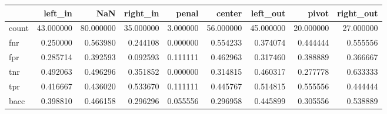 \begin{tabular}{lrrrrrrrr}
\toprule
{} &    left\_in &        NaN &   right\_in &     penal &     center &   left\_out &      pivot &  right\_out \\
\midrule
count &  43.000000 &  80.000000 &  35.000000 &  3.000000 &  56.000000 &  45.000000 &  20.000000 &  27.000000 \\
fnr   &   0.250000 &   0.563980 &   0.244108 &  0.000000 &   0.554233 &   0.374074 &   0.444444 &   0.555556 \\
fpr   &   0.285714 &   0.392593 &   0.092593 &  0.111111 &   0.462963 &   0.317460 &   0.388889 &   0.366667 \\
tnr   &   0.492063 &   0.496296 &   0.351852 &  0.000000 &   0.314815 &   0.460317 &   0.277778 &   0.633333 \\
tpr   &   0.416667 &   0.436020 &   0.533670 &  0.111111 &   0.445767 &   0.514815 &   0.555556 &   0.444444 \\
bacc  &   0.398810 &   0.466158 &   0.296296 &  0.055556 &   0.296958 &   0.445899 &   0.305556 &   0.538889 \\
\bottomrule
\end{tabular}

